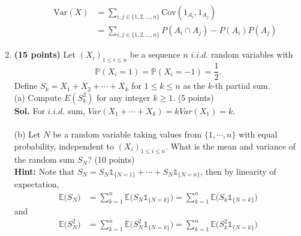 \begin{enumerate}
\begin{itemize}
\begin{equation*}
\begin{aligned}
            \end{aligned}
        \end{equation*}
        \begin{equation*}
            \begin{aligned}
                \text{Var}(X) &= \sum_{i,j \in \{1,2, \dots ,n\}} \text{Cov}(1_{A_{i} } , 1_{A_{j} } ) 
                    \\ &= \sum_{i,j \in \{1,2, \dots ,n\}}P(A_i \cap A_{j} ) - P(A_{i} )P(A_{j} ) 
            \end{aligned}
        \end{equation*}
    \end{itemize}

    \item \textbf{(15 points)}
    Let $(X_i)_{1\leq i\leq n}$ be a sequence $n$ $i.i.d.$ random variables with
\begin{equation*}
\mathbb{P}(X_i=1)=\mathbb{P}(X_i=-1)=\frac{1}{2}.
\end{equation*}
Define $S_k=X_1+X_2+\cdots+X_k$ for $1\leq k\leq n$ as the $k$-th partial sum.\\
(a) Compute $E(S_{k}^{2})$ for any integer $k\ge 1$. (5 points)\\
\textbf{Sol.} For $i.i.d.$ sum, $Var(X_1+\cdots+X_k)=kVar(X_1)=k$.
\\
\\
(b) Let $N$ be a random variable taking values from $\{1,\cdots,n\}$ with equal probability, independent to $(X_i)_{1\leq i\leq n}$. What is the mean  and variance of the random sum $S_{N}$?  (10 points) \\
\textbf{Hint:} Note that $S_N=S_N\mathds{1}_{\{N=1\}}+\cdots+S_N\mathds{1}_{\{N=n\}}$, then by linearity of expectation,
\begin{equation*}
\begin{aligned}
\mathbb{E}\big(S_N\big) &= \sum_{k=1}^n\mathbb{E}\big(S_N \mathds{1}_{\{N=k\}}\big)=\sum_{k=1}^n\mathbb{E}\big(S_k \mathds{1}_{\{N=k\}}\big)
\end{aligned}
\end{equation*}
and
\begin{equation*}
\begin{aligned}
\mathbb{E}\big(S_N^2\big) &= \sum_{k=1}^n\mathbb{E}\big(S_N^2\mathds{1}_{\{N=k\}}\big)=\sum_{k=1}^n\mathbb{E}\big(S_k^2\mathds{1}_{\{N=k\}}\big)
\end{aligned}
\end{equation*}


\end{enumerate}
